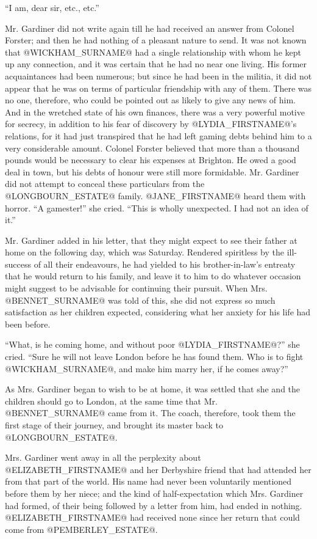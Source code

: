 ``I am, dear sir, etc., etc.''

Mr. Gardiner did not write again till he had received an answer from
Colonel Forster; and then he had nothing of a pleasant nature to send.
It was not known that @WICKHAM_SURNAME@ had a single relationship with whom he
kept up any connection, and it was certain that he had no near one
living. His former acquaintances had been numerous; but since he
had been in the militia, it did not appear that he was on terms of
particular friendship with any of them. There was no one, therefore,
who could be pointed out as likely to give any news of him. And in the
wretched state of his own finances, there was a very powerful motive for
secrecy, in addition to his fear of discovery by @LYDIA_FIRSTNAME@'s relations, for
it had just transpired that he had left gaming debts behind him to a
very considerable amount. Colonel Forster believed that more than a
thousand pounds would be necessary to clear his expenses at Brighton.
He owed a good deal in town, but his debts of honour were still more
formidable. Mr. Gardiner did not attempt to conceal these particulars
from the @LONGBOURN_ESTATE@ family. @JANE_FIRSTNAME@ heard them with horror. ``A gamester!''
she cried. ``This is wholly unexpected. I had not an idea of it.''

Mr. Gardiner added in his letter, that they might expect to see their
father at home on the following day, which was Saturday. Rendered
spiritless by the ill-success of all their endeavours, he had yielded
to his brother-in-law's entreaty that he would return to his family, and
leave it to him to do whatever occasion might suggest to be advisable
for continuing their pursuit. When Mrs. @BENNET_SURNAME@ was told of this, she did
not express so much satisfaction as her children expected, considering
what her anxiety for his life had been before.

``What, is he coming home, and without poor @LYDIA_FIRSTNAME@?'' she cried. ``Sure he
will not leave London before he has found them. Who is to fight @WICKHAM_SURNAME@,
and make him marry her, if he comes away?''

As Mrs. Gardiner began to wish to be at home, it was settled that she
and the children should go to London, at the same time that Mr. @BENNET_SURNAME@
came from it. The coach, therefore, took them the first stage of their
journey, and brought its master back to @LONGBOURN_ESTATE@.

Mrs. Gardiner went away in all the perplexity about @ELIZABETH_FIRSTNAME@ and her
Derbyshire friend that had attended her from that part of the world. His
name had never been voluntarily mentioned before them by her niece; and
the kind of half-expectation which Mrs. Gardiner had formed, of their
being followed by a letter from him, had ended in nothing. @ELIZABETH_FIRSTNAME@ had
received none since her return that could come from @PEMBERLEY_ESTATE@.

